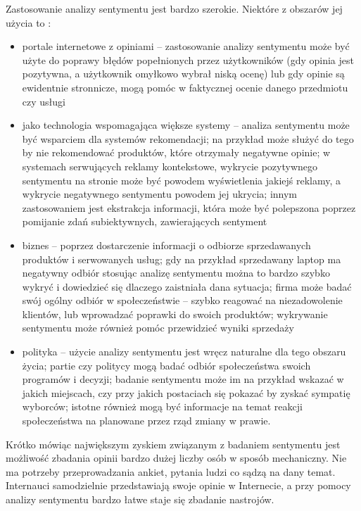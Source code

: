 Zastosowanie analizy sentymentu jest bardzo szerokie. Niektóre
z obszarów jej użycia to \cite{pangLeeApplication}:
\begin{itemize}
  \item portale internetowe z opiniami -- zastosowanie analizy sentymentu
może być użyte do poprawy błędów popełnionych przez użytkowników (gdy opinia
jest pozytywna, a użytkownik omyłkowo wybrał niską ocenę) lub gdy opinie
są ewidentnie stronnicze, mogą pomóc w faktycznej ocenie danego przedmiotu czy 
usługi
\item jako technologia wspomagająca większe systemy -- analiza sentymentu może
być wsparciem dla systemów rekomendacji; na przykład może służyć do 
tego by nie rekomendować produktów, które otrzymały negatywne opinie; 
w systemach serwujących reklamy kontekstowe, wykrycie pozytywnego sentymentu
na stronie może być powodem wyświetlenia jakiejś reklamy,
a wykrycie negatywnego sentymentu powodem jej ukrycia;
innym zastosowaniem jest ekstrakcja informacji, która może być
polepszona poprzez pomijanie zdań subiektywnych, zawierających sentyment
\item biznes -- poprzez dostarczenie informacji o odbiorze sprzedawanych produktów
i serwowanych usług; gdy na przykład sprzedawany laptop ma negatywny odbiór
stosując analizę sentymentu można to bardzo szybko wykryć i dowiedzieć się
dlaczego zaistniała dana sytuacja; firma może badać swój ogólny odbiór
w społeczeństwie -- szybko reagować na niezadowolenie klientów, lub wprowadzać
poprawki do swoich produktów; wykrywanie sentymentu może również pomóc
przewidzieć wyniki sprzedaży
\item polityka -- użycie analizy sentymentu jest wręcz naturalne dla tego obszaru
życia; partie czy politycy mogą badać odbiór społeczeństwa swoich programów
i decyzji; badanie sentymentu może im na przykład wskazać w jakich miejscach,
czy przy jakich postaciach się pokazać by zyskać sympatię wyborców; istotne
również mogą być informacje na temat reakcji społeczeństwa na planowane
przez rząd zmiany w prawie. 
\end{itemize}

Krótko mówiąc największym zyskiem związanym z badaniem sentymentu jest możliwość
zbadania opinii bardzo dużej liczby osób w sposób mechaniczny. Nie ma potrzeby
przeprowadzania ankiet, pytania ludzi co sądzą na dany temat. Internauci samodzielnie
przedstawiają swoje opinie w Internecie, a przy pomocy analizy sentymentu bardzo
łatwe staje się zbadanie nastrojów.




